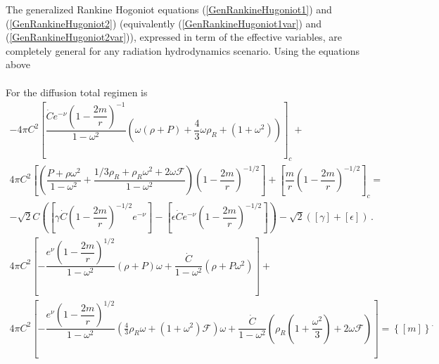 \documentclass[notitlepage,letterpaper, 10pt]{article}
\begin{document}
The generalized Rankine Hogoniot equations (\ref{GenRankineHugoniot1}) and (\ref{GenRankineHugoniot2}) (equivalently (\ref{GenRankineHugoniot1var}) and (\ref{GenRankineHugoniot2var})), expressed in term of the effective variables, are completely general for any radiation hydrodynamics scenario.  
Using the equations above

\begin{align}
    
\end{align}
For the diffusion total regimen is 
\begin{align}
    -4\pi C^{2} \left[ \dfrac{\dot{C}e^{-\nu}\left(1-\dfrac{2m}{r} \right)^{-1}}{1-\omega^2} \left(\omega \left( \rho + P \right) + \dfrac{4}{3} \omega \rho_{R} + \left(1+\omega^{2} \right) \right) \right]_{c} + \quad \quad
    \nonumber \\
    4\pi C^{2} \left[ \left( \dfrac{P + \rho \omega^{2}}{1-\omega^{2}}+ \dfrac{1/3 \rho_{R}+\rho_{R}\omega^{2}+2\omega\mathcal{F}}{1-\omega^{2}}\right) \left( 1-\dfrac{2m}{r} \right)^{-1/2} \right] + \left[\dfrac{m}{r}\left( 1-\dfrac{2m}{r} \right)^{-1/2} \right]_{c}= \quad \quad \nonumber \\ 
 -\sqrt{2}C \left( \left[ \gamma \dot{C}\left( 1-\dfrac{2m}{r} \right)^{-1/2} e^{-\nu}\right]- \left[ \epsilon \dot{C} e^{-\nu}\left( 1-\dfrac{2m}{r} \right)^{-1/2}\right]\right)- \sqrt{2} \left(\left[ \gamma\right] + \left[ \epsilon \right] \right)\, .
\end{align}
\begin{align}
    4 \pi C^{2} \left[ -\dfrac{e^{\nu}\left( 1-\dfrac{2m}{r} \right)^{1/2}}{1-\omega^{2}}\left( \rho + P \right)\omega + \dfrac{\dot{C}}{1-\omega^{2}}\left(\rho + P\omega^{2} \right) \right]+
\nonumber \\
4 \pi C^{2} \left[-\dfrac{e^{\nu}\left( 1-\dfrac{2m}{r} \right)^{1/2}}{1-\omega^{2}}\left( \frac{4}{3}\rho_{R}\omega + \left( 1+\omega^{2}\right)\mathcal{F} \right)\omega + \dfrac{\dot{C}}{1-\omega^{2}}\left(\rho_{R}\left(1+\dfrac{\omega^{2}}{3} \right)+ 2\omega \mathcal{F} \right) \right] = \left \{ \left[m \right] \right \}^{.}
\end{align}
\end{document}
